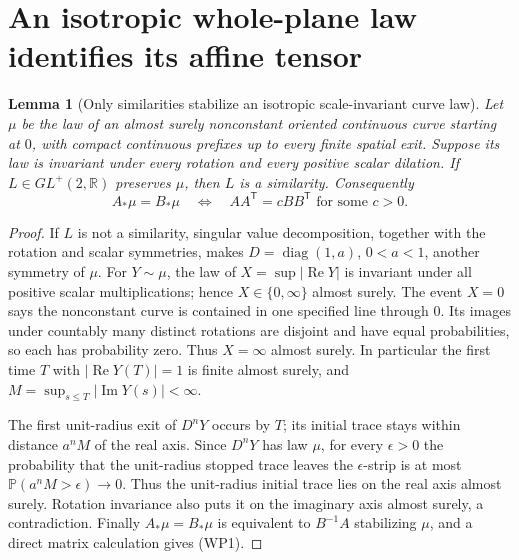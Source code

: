 \documentclass[11pt]{article}
\newtheorem{lemma}[theorem]{Lemma}
\theoremstyle{definition}\newtheorem{definition}[theorem]{Definition}
\theoremstyle{remark}\newtheorem{remark}[theorem]{Remark}
\newcommand{\RR}{\mathbb R}
\begin{document}
\section{An isotropic whole-plane law identifies its affine tensor}
\label{sec:wholeplane-decoder}

\begin{lemma}[Only similarities stabilize an isotropic scale-invariant curve law]
\label{lem:wp-stabilizer}
Let $\mu$ be the law of an almost surely nonconstant oriented continuous
curve starting at $0$, with compact continuous prefixes up to every
finite spatial exit. Suppose its law is invariant under every rotation
and every positive scalar dilation. If $L\in GL^+(2,\RR)$ preserves
$\mu$, then $L$ is a similarity. Consequently
\[
 A_*\mu=B_*\mu
 \quad\Longleftrightarrow\quad
 AA^{\mathsf T}=cBB^{\mathsf T}\text{ for some }c>0.
 \tag{WP1}
\]
\end{lemma}
\begin{proof}
If $L$ is not a similarity, singular value decomposition, together
with the rotation and scalar symmetries, makes
$D=\operatorname{diag}(1,a)$, $0<a<1$, another symmetry of $\mu$.
For $Y\sim\mu$, the law of $X=\sup|\operatorname{Re}Y|$
is invariant under all positive scalar multiplications; hence
$X\in\{0,\infty\}$ almost surely. The event $X=0$ says the
nonconstant curve is contained in one specified line through $0$.
Its images under countably many distinct rotations are disjoint and
have equal probabilities, so each has probability zero. Thus $X=\infty$
almost surely. In particular the first time $T$ with
$|\operatorname{Re}Y(T)|=1$ is finite almost surely, and
$M=\sup_{s\le T}|\operatorname{Im}Y(s)|<\infty$.

The first unit-radius exit of $D^nY$ occurs by $T$; its initial
trace stays within distance $a^nM$ of the real axis. Since $D^nY$
has law $\mu$, for every $\epsilon>0$ the probability that the
unit-radius stopped trace leaves the $\epsilon$-strip is at most
$\mathbb P(a^nM>\epsilon)\to0$. Thus the unit-radius initial
trace lies on the real axis almost surely. Rotation invariance
also puts it on the imaginary axis almost surely, a contradiction.
Finally $A_*\mu=B_*\mu$ is equivalent to $B^{-1}A$ stabilizing
$\mu$, and a direct matrix calculation gives (WP1).
\end{proof}



\end{document}

